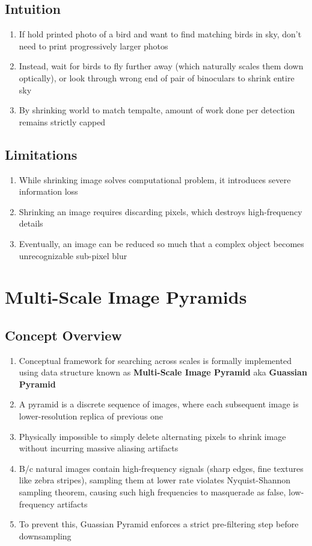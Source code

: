 \documentclass[12pt]{article}
\begin{document}
\subsection{Intuition}
\begin{enumerate}
    \item If hold printed photo of a bird and want to find matching birds in sky, don't need to print progressively larger photos
    \item Instead, wait for birds to fly further away (which naturally scales them down optically), or look through wrong end of pair of binoculars to shrink entire sky
    \item By shrinking world to match tempalte, amount of work done per detection remains strictly capped
\end{enumerate}

\subsection{Limitations}
\begin{enumerate}
    \item While shrinking image solves computational problem, it introduces severe information loss
    \item Shrinking an image requires discarding pixels, which destroys high-frequency details
    \item Eventually, an image can be reduced so much that a complex object becomes unrecognizable sub-pixel blur
\end{enumerate}


\section{Multi-Scale Image Pyramids}

\subsection{Concept Overview}
\begin{enumerate}
    \item Conceptual framework for searching across scales is formally implemented using data structure known as \textbf{Multi-Scale Image Pyramid} aka \textbf{Guassian Pyramid}
    \item A pyramid is a discrete sequence of images, where each subsequent image is lower-resolution replica of previous one
    \item Physically impossible to simply delete alternating pixels to shrink image without incurring massive aliasing artifacts
    \item B/c natural images contain high-frequency signals (sharp edges, fine textures like zebra stripes), sampling them at lower rate violates Nyquist-Shannon sampling theorem, causing such high frequencies to masquerade as false, low-frequency artifacts
    \item To prevent this, Guassian Pyramid enforces a strict pre-filtering step before downsampling
\end{enumerate}
\end{document}
